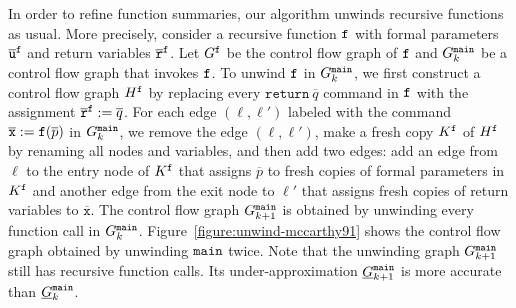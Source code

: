 In order to refine function summaries, our algorithm unwinds recursive
functions as usual. More precisely, consider a recursive function
$\mathtt{{f}}$ with formal parameters $\overline{\mathtt{u}}^{\mathtt{{f}}}$
and return variables $\overline{\mathtt{r}}^{\mathtt{{f}}}$.
Let $G^{\mathtt{{f}}}$ be the control flow graph of $\mathtt{{f}}$ and $G^{\mathtt{{main}}}_k$
be a control flow graph that invokes $\mathtt{{f}}$.
To unwind $\mathtt{{f}}$ in $G^{\mathtt{{main}}}_k$,
we first construct a control flow graph $H^{\mathtt{{f}}}$ by
replacing every $\mathtt{return}\ \overline{q}$ command in
$\mathtt{{f}}$ with the assignment $\overline{\mathtt{r}}^{\mathtt{{f}}} :=
\overline{q}$. For each edge $(\ell,  
\ell')$ labeled with the command $\overline{\mathtt{x}} :=
\mathtt{{f}}(\overline{p})$ in $G^{\mathtt{{main}}}_k$, we remove
the edge $(\ell, \ell')$, make a fresh copy $K^{\mathtt{{f}}}$ of $H^{\mathtt{{f}}}$ by
renaming all nodes and variables, and then add two edges: add an edge
from $\ell$ to the entry node of $K^{\mathtt{{f}}}$ that assigns
$\overline{p}$ to fresh copies of formal parameters in 
$K^{\mathtt{{f}}}$ and another edge from the exit node to $\ell'$ that
assigns fresh copies of return variables to
$\overline{\mathtt{x}}$. The control flow graph $G^{\mathtt{{main}}}_{k+1}$ 
is obtained by unwinding every function call in $G^{\mathtt{{main}}}_k$. 
Figure~\ref{figure:unwind-mccarthy91} shows the control flow graph
obtained by unwinding $\mathtt{{main}}$ twice. Note that the
unwinding graph $G^{\mathtt{{main}}}_{k+1}$ still has recursive function calls. Its
under-approximation $\underline{G}^{\mathtt{{main}}}_{k+1}$ is more
accurate than $\underline{G}^{\mathtt{{main}}}_k$. 

